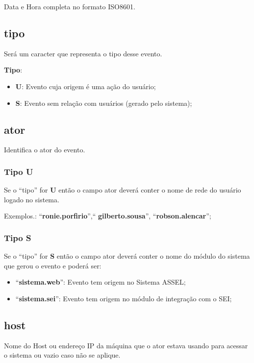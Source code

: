 Data e Hora completa no formato ISO8601.

\subsection{tipo}

Será um caracter que representa o tipo desse evento.

\textbf{Tipo}: 
\begin{itemize}
	\item \textbf{U}: Evento cuja origem é uma ação do usuário;
	\item \textbf{S}: Evento sem relação com usuários (gerado pelo sistema);
\end{itemize}

\subsection{ator}

Identifica o ator do evento.

\subsubsection{Tipo U}

Se o ``tipo'' for \textbf{U} então o campo ator deverá conter o nome de rede do usuário logado no sistema.

Exemplos.: ``\textbf{ronie.porfirio}'',`` \textbf{gilberto.sousa}'', ``\textbf{robson.alencar}'';

\subsubsection{Tipo S}

Se o ``tipo'' for \textbf{S} então o campo ator deverá conter o nome do módulo do sistema que gerou o evento e poderá ser:

\begin{itemize}
	\item ``\textbf{sistema.web}'': Evento tem origem no Sistema ASSEL; 
	\item ``\textbf{sistema.sei}'': Evento tem origem no módulo de integração com o SEI; 
\end{itemize}


\subsection{host}

Nome do Host ou endereço IP da máquina que o ator estava usando para acessar o sistema ou vazio caso não se aplique.

